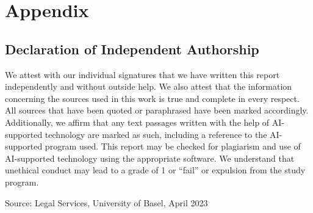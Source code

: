 \documentclass{article}
\begin{document}
\pagebreak

\section{Appendix}

\subsection{Declaration of Independent Authorship}

We attest with our individual signatures that we have written this report independently and without outside
help. We also attest that the information concerning the sources used in this work is true and complete in every
respect. All sources that have been quoted or paraphrased have been marked accordingly.
Additionally, we affirm that any text passages written with the help of AI-supported technology are marked as
such, including a reference to the AI-supported program used.
This report may be checked for plagiarism and use of AI-supported technology using the appropriate software.
We understand that unethical conduct may lead to a grade of 1 or “fail” or expulsion from the study program.

Source: Legal Services, University of Basel, April 2023
\end{document}
